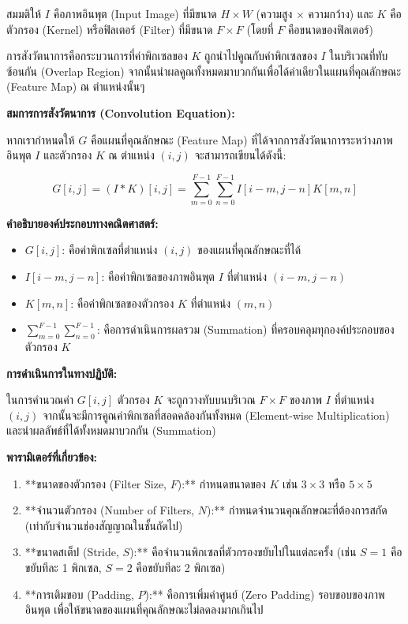 \documentclass[11pt,a4paper,openany]{report}
\begin{document}
สมมติให้ $I$ คือภาพอินพุต (Input Image) ที่มีขนาด $H \times W$ (ความสูง $\times$ ความกว้าง) และ $K$ คือตัวกรอง (Kernel) หรือฟิลเตอร์ (Filter) ที่มีขนาด $F \times F$ (โดยที่ $F$ คือขนาดของฟิลเตอร์)

การสังวัตนาการคือกระบวนการที่ค่าพิกเซลของ $K$ ถูกนำไปคูณกับค่าพิกเซลของ $I$ ในบริเวณที่ทับซ้อนกัน (Overlap Region) จากนั้นนำผลคูณทั้งหมดมาบวกกันเพื่อได้ค่าเดียวในแผนที่คุณลักษณะ (Feature Map) ณ ตำแหน่งนั้นๆ

\textbf{สมการการสังวัตนาการ (Convolution Equation):}

หากเรากำหนดให้ $G$ คือแผนที่คุณลักษณะ (Feature Map) ที่ได้จากการสังวัตนาการระหว่างภาพอินพุต $I$ และตัวกรอง $K$ ณ ตำแหน่ง $(i, j)$ จะสามารถเขียนได้ดังนี้:

$$G[i, j] = (I * K)[i, j] = \sum_{m=0}^{F-1} \sum_{n=0}^{F-1} I[i-m, j-n] K[m, n]$$


\textbf{คำอธิบายองค์ประกอบทางคณิตศาสตร์:}

\begin{itemize}
  \item $G[i, j]$: คือค่าพิกเซลที่ตำแหน่ง $(i, j)$ ของแผนที่คุณลักษณะที่ได้
  \item $I[i-m, j-n]$: คือค่าพิกเซลของภาพอินพุต $I$ ที่ตำแหน่ง $(i-m, j-n)$
  \item $K[m, n]$: คือค่าพิกเซลของตัวกรอง $K$ ที่ตำแหน่ง $(m, n)$
  \item $\sum_{m=0}^{F-1} \sum_{n=0}^{F-1}$: คือการดำเนินการผลรวม (Summation) ที่ครอบคลุมทุกองค์ประกอบของตัวกรอง $K$
\end{itemize}


\textbf{การดำเนินการในทางปฏิบัติ:}

ในการคำนวณค่า $G[i, j]$ ตัวกรอง $K$ จะถูกวางทับบนบริเวณ $F \times F$ ของภาพ $I$ ที่ตำแหน่ง $(i, j)$ จากนั้นจะมีการคูณค่าพิกเซลที่สอดคล้องกันทั้งหมด (Element-wise Multiplication) และนำผลลัพธ์ที่ได้ทั้งหมดมาบวกกัน (Summation)

\textbf{พารามิเตอร์ที่เกี่ยวข้อง:}

\begin{enumerate}
  \item **ขนาดของตัวกรอง (Filter Size, $F$):** กำหนดขนาดของ $K$ เช่น $3 \times 3$ หรือ $5 \times 5$
  \item **จำนวนตัวกรอง (Number of Filters, $N$):** กำหนดจำนวนคุณลักษณะที่ต้องการสกัด (เท่ากับจำนวนช่องสัญญาณในชั้นถัดไป)
  \item **ขนาดสเต็ป (Stride, $S$):** คือจำนวนพิกเซลที่ตัวกรองขยับไปในแต่ละครั้ง (เช่น $S=1$ คือขยับทีละ 1 พิกเซล, $S=2$ คือขยับทีละ 2 พิกเซล)
  \item **การเติมขอบ (Padding, $P$):** คือการเพิ่มค่าศูนย์ (Zero Padding) รอบขอบของภาพอินพุต เพื่อให้ขนาดของแผนที่คุณลักษณะไม่ลดลงมากเกินไป
\end{enumerate}
\end{document}
